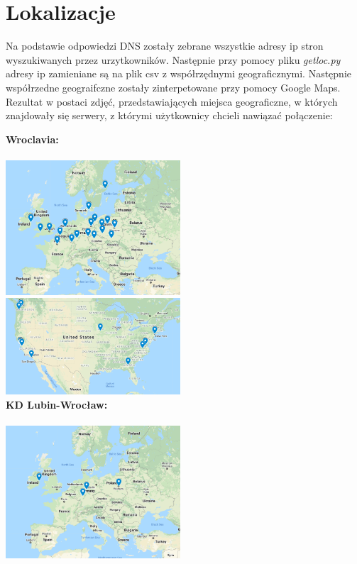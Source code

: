 \documentclass[12pt,a4paper]{article}
\begin{document}
    \section{Lokalizacje}
        Na podstawie odpowiedzi DNS zostały zebrane wszystkie adresy ip stron wyszukiwanych przez urzytkowników.
        Następnie przy pomocy pliku \textit{getloc.py} adresy ip zamieniane są na plik csv z współrzędnymi geograficznymi. Następnie współrzedne geograifczne zostały zinterpetowane przy pomocy Google Maps.\\
        Rezultat w postaci zdjęć, przedstawiających miejsca geograficzne, w których znajdowały się serwery, z którymi użytkownicy chcieli nawiązać połączenie:
        \begin{multicols}{2}
            \begin{center}
                \textbf{Wroclavia:}\\~\\
                \includegraphics[width=6.5cm]{Wroclavia_map_eu}\\
                \includegraphics[width=6.5cm]{Wroclavia_map_us}\\
                \textbf{KD Lubin-Wrocław:}\\~\\
                \includegraphics[width=6.5cm]{KD_map_eu}\\

\end{center}
\end{multicols}
\end{document}
